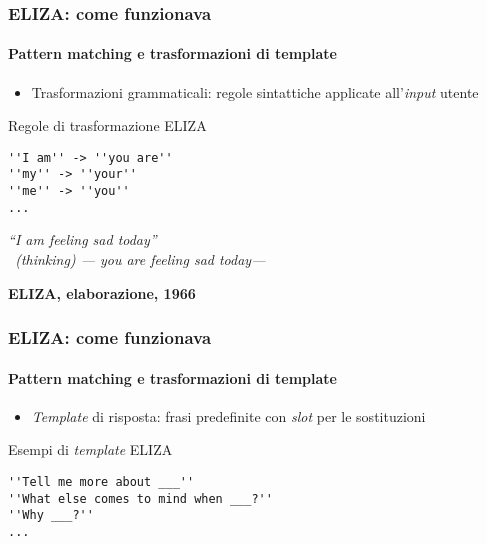%
\begin{frame}[t,fragile] \frametitle{ELIZA: come funzionava}
	{\small
		\framesubtitle{Pattern matching e trasformazioni di template}
		\begin{itemize}[leftmargin=10pt,align=right]
			\item[\alert{\faArrowCircleRight}] \alert{Trasformazioni grammaticali:} regole sintattiche applicate all'\textit{input} utente
		\end{itemize}
		\vspace*{.3cm}
		\hspace*{4cm}
		\begin{codeblock}{Regole di trasformazione ELIZA}
        	\begin{verbatim}
''I am'' -> ''you are''
''my'' -> ''your''
''me'' -> ''you''
...
        	\end{verbatim}
    	\end{codeblock}
		\hspace*{4cm}
		\begin{minipage}[t]{.6\textwidth}
			\renewcommand{\epigraphsize}{\scriptsize}
			\setlength{\afterepigraphskip}{0pt}
			\setlength{\beforeepigraphskip}{5pt}
			\setlength{\epigraphwidth}{0.9\textwidth}
			\epigraph{\textit{\alert{\faUser} ``\alert{I am} feeling sad today''\\
			\alert{\faTerminal\ (thinking)} --- \alert{you are} feeling sad today---}}{\textbf{ELIZA, elaborazione, 1966}}
		\end{minipage}
	}
\end{frame}
%
\begin{frame}[t,fragile] \frametitle{ELIZA: come funzionava}
	{\small
		\framesubtitle{Pattern matching e trasformazioni di template}
		\begin{itemize}[leftmargin=10pt,align=right]
			\item[\alert{\faArrowCircleRight}] \alert{\textit{Template} di risposta:} frasi predefinite con \textit{slot} per le sostituzioni
		\end{itemize}
		\vspace*{.3cm}
		\hspace*{4cm}
		\begin{codeblock}{Esempi di \textit{template} ELIZA}
        	\begin{verbatim}
''Tell me more about ___''
''What else comes to mind when ___?''
''Why ___?''
...
        	\end{verbatim}
    	\end{codeblock}
	}
\end{frame}
